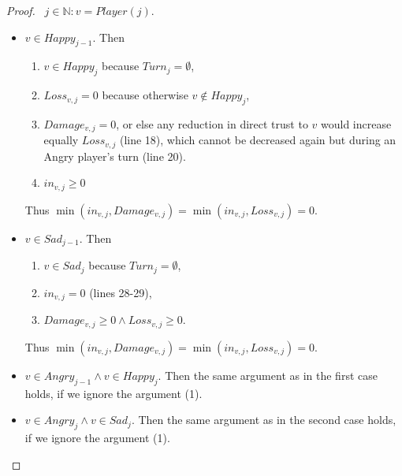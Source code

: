\documentclass[11pt]{article}
\theoremstyle{definition}
\theoremstyle{corollary}
\theoremstyle{lemma}
\begin{document}
    \begin{proof} \ 
       $j \in \mathbb{N}: v = Player(j)$.
       \begin{itemize}
          \item $v \in Happy_{j-1}$. Then
          \begin{enumerate}
             \item $v \in Happy_j$ because $Turn_{j} = \emptyset$,
             \item $Loss_{v, j} = 0$ because otherwise $v \notin Happy_j$,
             \item $Damage_{v, j} = 0$, or else any reduction in direct trust to $v$ would increase equally
             $Loss_{v, j}$ (line 18), which cannot be decreased again but during an Angry player's turn (line 20).
             \item $in_{v, j} \geq 0$
          \end{enumerate}
          Thus $\min(in_{v, j}, Damage_{v,j}) = \min(in_{v, j}, Loss_{v,j}) = 0$.
          \item $v \in Sad_{j-1}$. Then
          \begin{enumerate}
             \item $v \in Sad_j$ because $Turn_{j} = \emptyset$, 
             \item $in_{v, j} = 0$ (lines 28-29),
             \item $Damage_{v, j} \geq 0 \wedge Loss_{v, j} \geq 0$.
          \end{enumerate}
          Thus $\min(in_{v, j}, Damage_{v,j}) = \min(in_{v, j}, Loss_{v,j}) = 0$.
          \item $v \in Angry_{j-1} \wedge v \in Happy_j$. Then the same argument as in the first case holds, if
          we ignore the argument (1).
          \item $v \in Angry_j \wedge v \in Sad_j$. Then the same argument as in the second case holds, if 
          we ignore the argument (1).
       \end{itemize}
    \end{proof}
\end{document}
